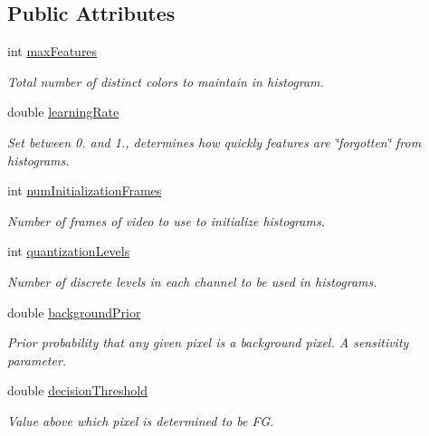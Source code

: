 \subsection*{Public Attributes}
\begin{DoxyCompactItemize}
\item 
int \hyperlink{classcv_1_1BackgroundSubtractorGMG_a76c047648867024272c6c63d9b47679b}{max\-Features}
\begin{DoxyCompactList}\small\item\em Total number of distinct colors to maintain in histogram. \end{DoxyCompactList}\item 
double \hyperlink{classcv_1_1BackgroundSubtractorGMG_ab573842c1b123e8ad99fe84a03f877b7}{learning\-Rate}
\begin{DoxyCompactList}\small\item\em Set between 0. and 1., determines how quickly features are \char`\"{}forgotten\char`\"{} from histograms. \end{DoxyCompactList}\item 
int \hyperlink{classcv_1_1BackgroundSubtractorGMG_a5378e398520be8ed6e696488d329b122}{num\-Initialization\-Frames}
\begin{DoxyCompactList}\small\item\em Number of frames of video to use to initialize histograms. \end{DoxyCompactList}\item 
int \hyperlink{classcv_1_1BackgroundSubtractorGMG_a224018fca5b296390d4c94943c19202a}{quantization\-Levels}
\begin{DoxyCompactList}\small\item\em Number of discrete levels in each channel to be used in histograms. \end{DoxyCompactList}\item 
double \hyperlink{classcv_1_1BackgroundSubtractorGMG_ac496a3272d5cc8b39b0b2a37f50a0686}{background\-Prior}
\begin{DoxyCompactList}\small\item\em Prior probability that any given pixel is a background pixel. A sensitivity parameter. \end{DoxyCompactList}\item 
double \hyperlink{classcv_1_1BackgroundSubtractorGMG_af160ea140a4bc9a24e784f94d06aebef}{decision\-Threshold}
\begin{DoxyCompactList}\small\item\em Value above which pixel is determined to be F\-G. \end{DoxyCompactList}\item 

\end{DoxyCompactItemize}
